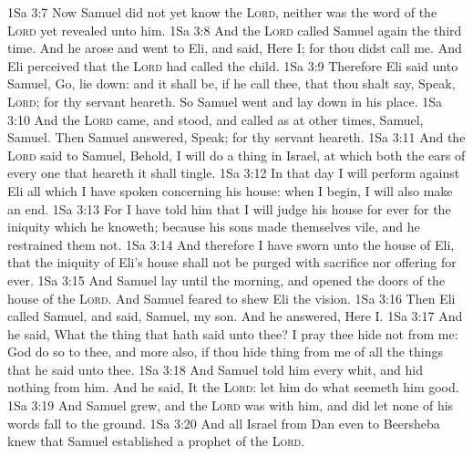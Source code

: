 \vs 1Sa 3:7 Now Samuel did not yet know the \textsc{Lord}, neither was the word of the \textsc{Lord} yet revealed unto him.
\vs 1Sa 3:8 And the \textsc{Lord} called Samuel again the third time. And he arose and went to Eli, and said, Here  I; for thou didst call me. And Eli perceived that the \textsc{Lord} had called the child.
\vs 1Sa 3:9 Therefore Eli said unto Samuel, Go, lie down: and it shall be, if he call thee, that thou shalt say, Speak, \textsc{Lord}; for thy servant heareth. So Samuel went and lay down in his place.
\vs 1Sa 3:10 And the \textsc{Lord} came, and stood, and called as at other times, Samuel, Samuel. Then Samuel answered, Speak; for thy servant heareth.
\vs 1Sa 3:11 And the \textsc{Lord} said to Samuel, Behold, I will do a thing in Israel, at which both the ears of every one that heareth it shall tingle.
\vs 1Sa 3:12 In that day I will perform against Eli all  which I have spoken concerning his house: when I begin, I will also make an end.
\vs 1Sa 3:13 For I have told him that I will judge his house for ever for the iniquity which he knoweth; because his sons made themselves vile, and he restrained them not.
\vs 1Sa 3:14 And therefore I have sworn unto the house of Eli, that the iniquity of Eli's house shall not be purged with sacrifice nor offering for ever.
\vs 1Sa 3:15 And Samuel lay until the morning, and opened the doors of the house of the \textsc{Lord}. And Samuel feared to shew Eli the vision.
\vs 1Sa 3:16 Then Eli called Samuel, and said, Samuel, my son. And he answered, Here  I.
\vs 1Sa 3:17 And he said, What  the thing that  hath said unto thee? I pray thee hide  not from me: God do so to thee, and more also, if thou hide  thing from me of all the things that he said unto thee.
\vs 1Sa 3:18 And Samuel told him every whit, and hid nothing from him. And he said, It  the \textsc{Lord}: let him do what seemeth him good.
\vs 1Sa 3:19 And Samuel grew, and the \textsc{Lord} was with him, and did let none of his words fall to the ground.
\vs 1Sa 3:20 And all Israel from Dan even to Beersheba knew that Samuel  established  a prophet of the \textsc{Lord}.
